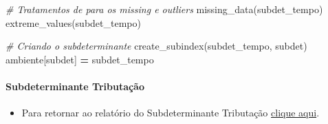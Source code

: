 \documentclass[
  12,
  dvipsnames]{article}
\newenvironment{Shaded}{\begin{snugshade}}{\end{snugshade}}
\newcommand{\CommentTok}[1]{\textcolor[rgb]{0.56,0.35,0.01}{\textit{#1}}}
\newcommand{\NormalTok}[1]{#1}
\newcommand{\OperatorTok}[1]{\textcolor[rgb]{0.81,0.36,0.00}{\textbf{#1}}}
\providecommand{\tightlist}{%
  \setlength{\itemsep}{0pt}\setlength{\parskip}{0pt}}
\begin{document}
\begin{Shaded}
\begin{Highlighting}[]
\CommentTok{\# Tratamentos de para os missing e outliers}
\NormalTok{missing\_data(subdet\_tempo)}
\NormalTok{extreme\_values(subdet\_tempo)}

\CommentTok{\# Criando o subdeterminante}
\NormalTok{create\_subindex(subdet\_tempo, subdet)}
\NormalTok{ambiente[subdet] }\OperatorTok{=}\NormalTok{ subdet\_tempo}
\end{Highlighting}
\end{Shaded}

\hypertarget{script_2.1.2}{%
\paragraph*{Subdeterminante Tributação}\label{script_2.1.2}}

\begin{itemize}
\tightlist
\item
  Para retornar ao relatório do Subdeterminante Tributação
  \protect\hyperlink{subdet_tributacao}{clique aqui}.
\end{itemize}
\end{document}
